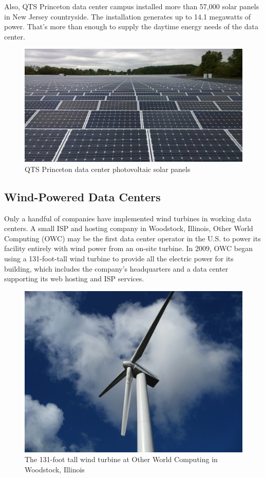         Also, QTS Princeton data center campus installed more than 57,000 solar panels in New Jersey countryside.
        The installation generates up to 14.1 megawatts of power. That's more than enough to supply the daytime
        energy needs of the data center\cite{qts-princeton-data-centers}.

        \begin{figure}[!h]\centering
            \includegraphics[width=.4\columnwidth]{3-State-of-the-art/figs/qts-solar-panels.jpg}
            \caption{QTS Princeton data center photovoltaic solar panels}
        \end{figure}

    \subsection{Wind-Powered Data Centers}
        Only a handful of companies have implemented wind turbines in working data centers.
        A small ISP and hosting company in Woodstock, Illinois, Other World Computing (OWC) may be the first
        data center operator in the U.S. to power its facility entirely with wind power from an on-site turbine.
        In 2009, OWC began using a 131-foot-tall wind turbine to provide all the electric power for its
        building, which includes the company’s headquarters and a data center supporting its web hosting and
        ISP services\cite{wind-powered-data-centers}.

        \begin{figure}[!h]\centering
            \includegraphics[width=.4\columnwidth]{3-State-of-the-art/figs/owc-wind-turbine.jpg}
            \caption{The 131-foot tall wind turbine at Other World Computing in Woodstock, Illinois}
        \end{figure}

